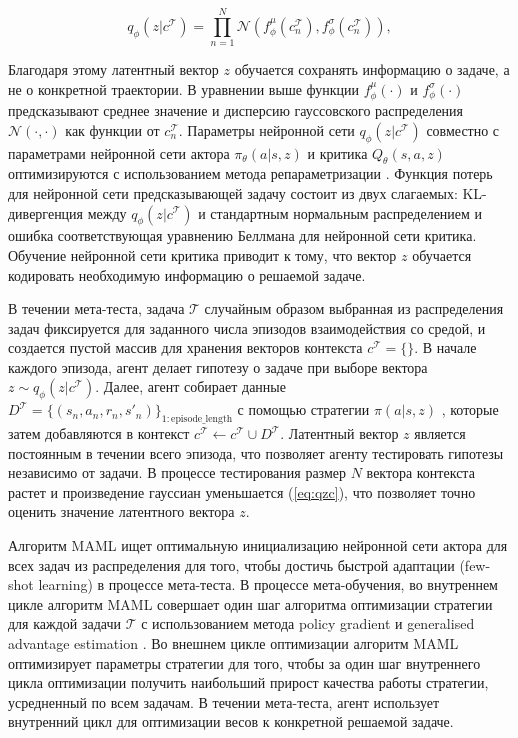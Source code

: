 \begin{equation}\label{eq:qzc}
    q_{\phi}(z|c^{\mathcal{T}}) = \prod_{n=1}^{N} \mathcal{N}(f^{\mu}_{\phi}(c_{n}^{\mathcal{T}}), f^{\sigma}_{\phi}(c_{n}^{\mathcal{T}})),
\end{equation}

Благодаря этому латентный вектор $z$ обучается сохранять информацию о задаче, а не о конкретной траектории. 
В уравнении выше функции $f^{\mu}_{\phi}(\cdot)$ и $f^{\sigma}_{\phi}(\cdot)$ предсказывают среднее значение и дисперсию гауссовского распределения $\mathcal{N}(\cdot,\cdot)$ как функции от $c_{n}^{\mathcal{T}}$. Параметры нейронной сети $q_{\phi}(z|c^{\mathcal{T}})$ совместно с параметрами нейронной сети актора $\pi_{\theta}(a|s, z)$ и критика $Q_{\theta}(s, a, z)$ оптимизируются с использованием метода  репараметризации \cite{vae}. 
Функция потерь для нейронной сети предсказывающей задачу состоит из двух слагаемых: KL-дивергенция между $q_{\phi}(z|c^{\mathcal{T}})$ и стандартным нормальным распределением  и ошибка соответствующая уравнению Беллмана для нейронной сети критика. Обучение нейронной сети критика приводит к тому, что вектор $z$ обучается кодировать необходимую информацию о решаемой задаче. 

В течении мета-теста, задача $\mathcal{T}$ случайным образом выбранная из распределения задач фиксируется для заданного числа эпизодов взаимодействия со средой, и создается пустой массив для хранения векторов контекста $c^\mathcal{T} = \{\}$. В начале каждого эпизода, агент делает гипотезу о задаче при выборе вектора  $z \sim q_{\phi}(z|c^\mathcal{T})$. Далее, агент собирает данные $D^\mathcal{T} = \{(s_{n}, a_{n}, r_{n}, s'_{n})\}_{1:{\mathrm{episode\_length}}}$ с помощью стратегии  $\pi(a| s, z)$ , которые затем добавляются в контекст $c^\mathcal{T} \leftarrow c^\mathcal{T} \cup D^\mathcal{T}$. 
Латентный вектор $z$ является постоянным в течении всего эпизода, что позволяет агенту тестировать гипотезы независимо от задачи. В процессе тестирования размер $N$ вектора контекста растет и произведение гауссиан уменьшается (\ref{eq:qzc}), что позволяет точно оценить значение латентного вектора $z$.

Алгоритм MAML ищет оптимальную инициализацию нейронной сети актора для всех задач из распределения для того, чтобы достичь быстрой адаптации (few-shot learning) в процессе мета-теста. В процессе мета-обучения, во внутреннем цикле алгоритм MAML совершает один шаг алгоритма оптимизации стратегии для каждой задачи $\mathcal{T}$ с использованием метода policy gradient и generalised advantage estimation \cite{gae}. 
Во внешнем цикле оптимизации алгоритм MAML оптимизирует параметры стратегии для того, чтобы за один шаг внутреннего цикла оптимизации получить наибольший прирост качества работы стратегии, усредненный по всем задачам. 
В течении мета-теста, агент использует внутренний цикл для оптимизации весов к конкретной решаемой задаче. 

